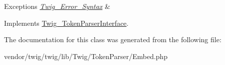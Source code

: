 \begin{DoxyExceptions}{Exceptions}
{\em \hyperlink{classTwig__Error__Syntax}{Twig\+\_\+\+Error\+\_\+\+Syntax}} & \\
\hline
\end{DoxyExceptions}


Implements \hyperlink{interfaceTwig__TokenParserInterface_a9d003ebcca4a13c6f36b86e79815e823}{Twig\+\_\+\+Token\+Parser\+Interface}.



The documentation for this class was generated from the following file\+:\begin{DoxyCompactItemize}
\item 
vendor/twig/twig/lib/\+Twig/\+Token\+Parser/Embed.\+php\end{DoxyCompactItemize}
